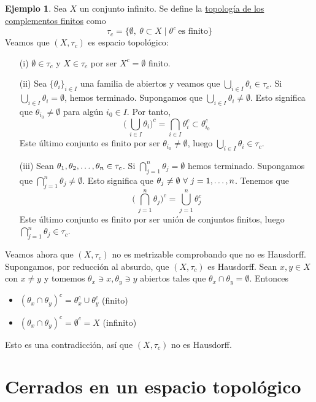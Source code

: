 \documentclass[12pt]{report}
\theoremstyle{definition}
\theoremstyle{definition}
\newtheorem{example}{Ejemplo}[chapter]
\theoremstyle{remark}
\begin{document}
\begin{example}
\label{ex1.5.}
Sea $X$ un conjunto infinito. Se define la \underline{topología de los complementos finitos} como \[\tau_c = \{\emptyset, \ \theta \subset X \mid \theta^c \ \textrm{es finito}\}\] Veamos que $(X,\tau_c)$ es espacio topológico:
\begin{itemize}
    \item[(i)] $\emptyset \in \tau_c$ y $X \in \tau_c$ por ser $X^c = \emptyset$ finito.
    \item[(ii)] Sea $\{\theta_i\}_{i \in I}$ una familia de abiertos y veamos que $\bigcup_{i \in I}\theta_i \in \tau_c$. Si $\bigcup_{i \in I}\theta_i = \emptyset$, hemos terminado. Supongamos que $\bigcup_{i \in I}\theta_i \neq \emptyset$. Esto significa que $\theta_{i_0} \neq \emptyset$ para algún $i_0 \in I$. Por tanto, \[\biggl( \, \bigcup_{i \in I}\theta_i \biggr)^c = \bigcap_{i \in I}\theta_i^c \subset \theta_{i_0}^c\] Este último conjunto es finito por ser $\theta_{i_0} \neq \emptyset$, luego $\bigcup_{i \in I}\theta_i \in \tau_c$.
    \item[(iii)] Sean $\theta_1,\theta_2,\mathellipsis,\theta_n \in \tau_c$. Si $\bigcap_{j=1}^n\theta_j = \emptyset$ hemos terminado. Supongamos que $\bigcap_{j=1}^n\theta_j \neq \emptyset$. Esto significa que $\theta_j \neq \emptyset \ \forall \ j=1,\mathellipsis,n$. Tenemos que \[\biggl( \, \bigcap_{j=1}^n\theta_j \biggr)^c = \bigcup_{j=1}^n\theta_j^c\] Este último conjunto es finito por ser unión de conjuntos finitos, luego $\bigcap_{j=1}^n\theta_j \in \tau_c$.
\end{itemize}
Veamos ahora que $(X,\tau_c)$ no es metrizable comprobando que no es Hausdorff. Supongamos, por reducción al absurdo, que $(X,\tau_c)$ es Hausdorff. Sean $x,y \in X$ con $x \neq y$ y tomemos $\theta_x \ni x, \theta_y \ni y$ abiertos tales que $\theta_x \cap \theta_y = \emptyset$. Entonces
\begin{itemize}
    \item $(\theta_x \cap \theta_y)^c = \theta_x^c \cup \theta_y^c$ (finito)
    \item $(\theta_x \cap \theta_y)^c = \emptyset^c = X$ (infinito)
\end{itemize}
Esto es una contradicción, así que $(X,\tau_c)$ no es Hausdorff.
\end{example}

\section{Cerrados en un espacio topológico}
\end{document}
